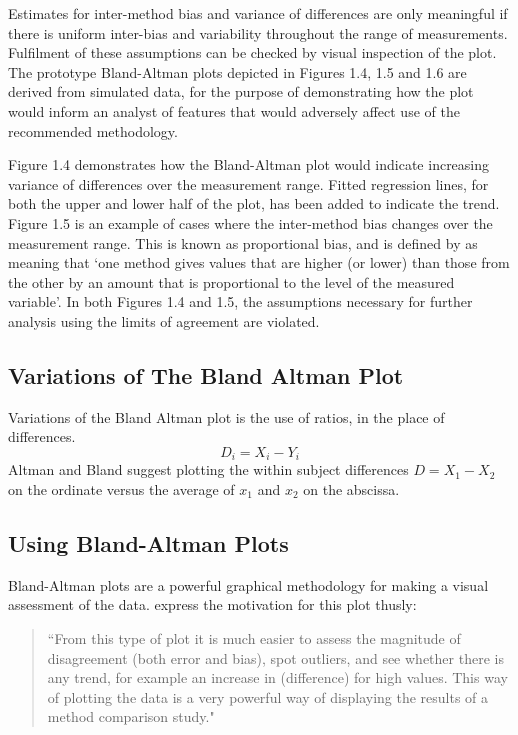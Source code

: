 \documentclass[Main.tex]{subfiles}
\begin{document}
	Estimates for inter-method bias and variance of differences are only meaningful if there is uniform inter-bias and variability throughout the range of measurements. Fulfilment of these assumptions can be checked by visual inspection of the plot. The prototype Bland-Altman plots depicted in Figures 1.4, 1.5 and 1.6 are derived from simulated data, for the purpose of demonstrating how the plot would inform an analyst of features that would adversely affect use of the recommended methodology.
	
	Figure 1.4 demonstrates how the Bland-Altman plot would indicate increasing variance of differences over the measurement range. Fitted regression lines, for both the upper and lower half of the plot, has been added to indicate the trend. Figure 1.5 is an example of cases where the inter-method bias changes over the measurement range. This is known as proportional bias, and is defined by \citet{ludbrook97} as meaning that `one method gives	values that are higher (or lower) than those from the other by an amount that is proportional to the level of the measured variable'. In both Figures 1.4 and 1.5, the assumptions necessary for further analysis using the limits of agreement are violated.
	




	

	\subsection{Variations of The Bland Altman Plot}

	Variations of the Bland Altman plot is the use of ratios, in the
	place of differences.
	\begin{equation}
	D_{i} = X_{i} - Y_{i}   \label{BA01}
	\end{equation}
	Altman and Bland suggest plotting the within subject differences $
	D = X_{1} - X_{2} $ on the ordinate versus the average of $x_{1}$
	and  $x_{2}$ on the abscissa.
	

	

	

	


	
	
	\subsection{Using Bland-Altman Plots}
	Bland-Altman plots are a powerful graphical methodology for making
	a visual assessment of the data. \citet*{BA83} express the
	motivation for this plot thusly:
	\begin{quote}
		``From this type of plot it is much easier to assess the magnitude
		of disagreement (both error and bias), spot outliers, and see
		whether there is any trend, for example an increase in
		(difference) for high values. This way of plotting the data is a
		very powerful way of displaying the results of a method comparison
		study."
	\end{quote}
	
\end{document}
